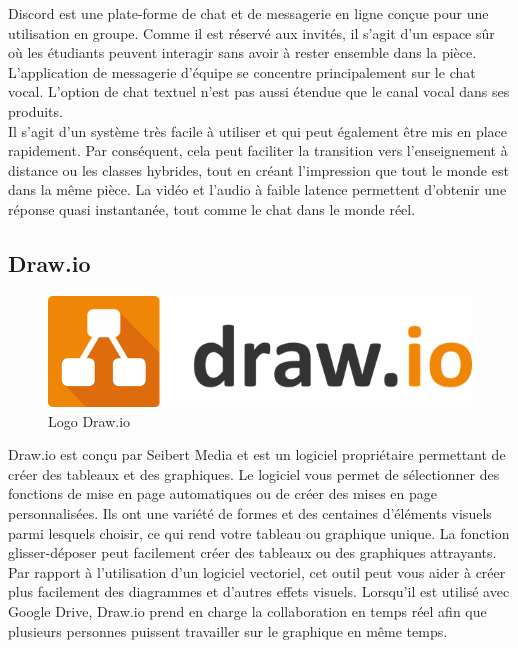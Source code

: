     Discord\cite{discord} est une plate-forme de chat et de messagerie en ligne conçue pour une utilisation en groupe. Comme il est réservé aux invités, il s'agit d'un espace sûr où les étudiants peuvent interagir sans avoir à rester ensemble dans la pièce. L'application de messagerie d'équipe se concentre principalement sur le chat vocal. L'option de chat textuel n'est pas aussi étendue que le canal vocal dans ses produits.\\

    Il s'agit d'un système très facile à utiliser et qui peut également être mis en place rapidement. Par conséquent, cela peut faciliter la transition vers l'enseignement à distance ou les classes hybrides, tout en créant l'impression que tout le monde est dans la même pièce. La vidéo et l'audio à faible latence permettent d'obtenir une réponse quasi instantanée, tout comme le chat dans le monde réel.\\

    \subsection{Draw.io}
    \begin{figure}[H]
        \centering
        \includegraphics[scale=0.4]{ACR/Drawio-Logo.png}
        \caption{Logo Draw.io}
    \end{figure}

    Draw.io\cite{drawio} est conçu par Seibert Media et est un logiciel propriétaire permettant de créer des tableaux et des graphiques. Le logiciel vous permet de sélectionner des fonctions de mise en page automatiques ou de créer des mises en page personnalisées. Ils ont une variété de formes et des centaines d'éléments visuels parmi lesquels choisir, ce qui rend votre tableau ou graphique unique. La fonction glisser-déposer peut facilement créer des tableaux ou des graphiques attrayants.\\

    Par rapport à l'utilisation d'un logiciel vectoriel, cet outil peut vous aider à créer plus facilement des diagrammes et d'autres effets visuels. Lorsqu'il est utilisé avec Google Drive, Draw.io prend en charge la collaboration en temps réel afin que plusieurs personnes puissent travailler sur le graphique en même temps.\\

